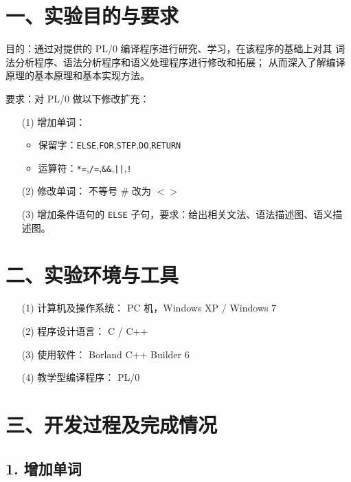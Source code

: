 \documentclass[]{guo}
\begin{document}
% 

\section{一、实验目的与要求}

目的：通过对提供的 PL/0 编译程序进行研究、学习，在该程序的基础上对其
词法分析程序、语法分析程序和语义处理程序进行修改和拓展；
从而深入了解编译原理的基本原理和基本实现方法。


要求：对 PL/0 做以下修改扩充：

\begin{enumerate}
    \item[(1)] 增加单词：
        \begin{itemize}
            \item 保留字：\texttt{ELSE},\texttt{FOR},\texttt{STEP},\texttt{DO},\texttt{RETURN}
            \item 运算符：\texttt{*=},\texttt{/=},\texttt{&&},\texttt{||},\texttt{!}
        \end{itemize}
    \item[(2)] 修改单词： 不等号 $\#$ 改为 $<>$
    \item[(3)] 增加条件语句的 \texttt{ELSE} 子句，要求：给出相关文法、语法描述图、语义描述图。
\end{enumerate}

\section{二、实验环境与工具}

\begin{enumerate}
    \item[(1)] 计算机及操作系统： PC 机，Windows XP / Windows 7
    \item[(2)] 程序设计语言： C / C++
    \item[(3)] 使用软件： Borland C++ Builder 6
    \item[(4)] 教学型编译程序： PL/0
\end{enumerate}

\section{三、开发过程及完成情况}

\subsection{1. 增加单词}
\end{document}
